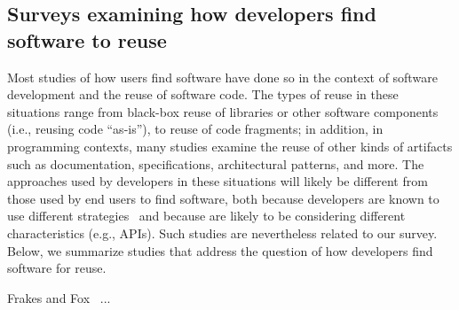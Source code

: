 \documentclass{casicswhitepaper}
\begin{document}
\subsection{Surveys examining how developers find software to reuse}

Most studies of how users find software have done so in the context of software development and the reuse of software code.  The types of reuse in these situations range from black-box reuse of libraries or other software components (i.e., reusing code ``as-is''), to reuse of code fragments; in addition, in programming contexts, many studies examine the reuse of other kinds of artifacts such as documentation, specifications, architectural patterns, and more.  The approaches used by developers in these situations will likely be different from those used by end users to find software, both because developers are known to use different strategies~\cite{} and because are likely to be considering different characteristics (e.g., APIs).  Such studies are nevertheless related to our survey.  Below, we summarize studies that address the question of how developers find software for reuse.

Frakes and Fox~\cite{frakes1995sixteen} ...
\end{document}
